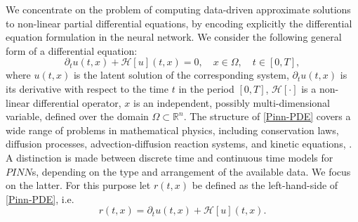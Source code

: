We concentrate on the problem of computing data-driven approximate solutions to non-linear partial differential equations, by encoding explicitly the differential equation formulation in the neural network. We consider the following general form of a differential equation:
\begin{equation}
    \label{Pinn-PDE}
    \partial_t u(t,x) + \mathcal{H} \left[ u \right] (t, x) = 0, \quad x \in \Omega, \quad t \in \left[ 0, T \right], 
\end{equation}
where $u(t,x)$ is the latent solution of the corresponding system, $\partial_t u(t,x)$ is its derivative with respect to the time $t$ in the period $\left[ 0, T \right]$, $\mathcal{H} \left[ \cdot \right]$ is a non-linear differential operator, $x$ is an independent, possibly multi-dimensional variable, defined over the domain $\Omega \subset \mathbb{R}^{n}$. The structure of \cref{Pinn-PDE} covers a wide range of problems in mathematical physics, including conservation laws, diffusion processes, advection-diffusion reaction systems, and kinetic equations, \cite[p.~3]{RaissiPerdikarisKarniadakisPart1:2017}. \\
A distinction is made between discrete time and continuous time models for $PINN$s, depending on the type and arrangement of the available data. We focus on the latter. For this purpose let $r(t,x)$ be defined as the left-hand-side of \cref{Pinn-PDE}, i.e.
\begin{equation}
    \label{Residual Network}
    r(t,x) = \partial_t u(t,x) + \mathcal{H} \left[ u \right] (t, x).
\end{equation}
